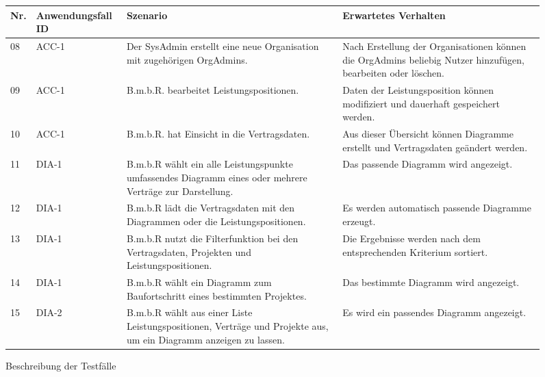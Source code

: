 \begin{figure}[!h]
	\begin{center}
		\begin{tabularx}{\textwidth}{ p{} | p{} | p{} | X }
			\textbf{Nr.} & \textbf{Anwendungsfall ID} & \textbf{Szenario} & \textbf{Erwartetes Verhalten} \\ \hline
			
			
			08 & ACC-1 & Der SysAdmin erstellt eine neue Organisation mit zugehörigen OrgAdmins. & Nach Erstellung der Organisationen können die OrgAdmins beliebig Nutzer hinzufügen, bearbeiten oder löschen. \\ \hline
			09 & ACC-1 & B.m.b.R. bearbeitet Leistungspositionen. & Daten der Leistungsposition können modifiziert und dauerhaft gespeichert werden. \\ \hline
			10 & ACC-1 & B.m.b.R. hat Einsicht in die Vertragsdaten. & Aus dieser Übersicht können Diagramme erstellt und Vertragsdaten geändert werden. \\ \hline
			11 & DIA-1 & B.m.b.R wählt ein alle Leistungspunkte umfassendes Diagramm eines oder mehrere Verträge zur Darstellung. & Das passende Diagramm wird angezeigt. \\ \hline 
			12 & DIA-1 & B.m.b.R lädt die Vertragsdaten mit den Diagrammen oder die Leistungspositionen. & Es werden automatisch passende Diagramme erzeugt. \\ \hline
			13 & DIA-1 & B.m.b.R nutzt die Filterfunktion bei den Vertragsdaten, Projekten und Leistungspositionen. & Die Ergebnisse werden nach dem entsprechenden Kriterium sortiert. \\ \hline
			14 & DIA-1 & B.m.b.R wählt ein Diagramm zum Baufortschritt eines bestimmten Projektes. & Das bestimmte Diagramm wird angezeigt.\\ \hline
			15 & DIA-2 & B.m.b.R wählt aus einer Liste Leistungspositionen, Verträge und Projekte aus, um ein Diagramm anzeigen zu lassen.  & Es wird ein passendes Diagramm angezeigt. \\ \hline 

		\end{tabularx}	
	\end{center}
	\caption{Beschreibung der Testfälle}
	\label{fig:testfaelle-mobile-app-tabelle}
\end{figure}